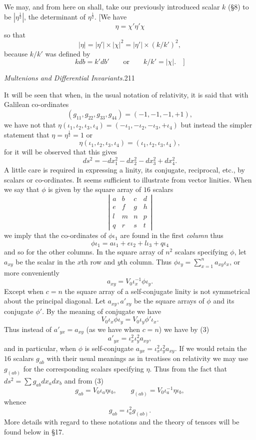 \documentclass[11pt]{article}
\begin{document}
\indent We may, and from here on shall, take our previously introduced scalar $k$ (§8) to be $|\eta^{\frac12}|$, the determinant of $\eta^{\frac12}$. [We have
\[
\eta=\chi'\eta'\chi
\]
so that
\[
|\eta|=|\eta'|\times|\chi|^2=|\eta'|\times(k/k')^2,
\]
because $k/k'$ was defined by
\[
kdb=k'db'\qquad\text{or}\qquad k/k'=|\chi|.\quad\text{]}
\]

\newpage\thispagestyle{empty}\begin{center}\textit{Multenions and Differential Invariants.}\hfill 211\end{center}
It will be seen that when, in the usual notation of relativity, it is said that with Galilean co-ordinates
\[
(g_{11},g_{22},g_{33},g_{44})=(-1,-1,-1,+1),
\]
we have not that $\eta(\iota_1,\iota_2,\iota_3,\iota_4)=(-\iota_1,-\iota_2,-\iota_3,+\iota_4)$ but instead the simpler statement that $\eta=\eta^{\frac12}=1$ or
\[
\eta(\iota_1,\iota_2,\iota_3,\iota_4)=(\iota_1,\iota_2,\iota_3,\iota_4),
\]
for it will be observed that this gives
\[
ds^2=-dx_1^2-dx_2^2-dx_3^2+dx_4^2.
\]
\indent A little care is required in expressing a linity, its conjugate, reciprocal, etc., by scalars or co-ordinates. It seems sufficient to illustrate from vector linities. When we say that $\phi$ is given by the square array of $16$ scalars
\[
\left|\begin{array}{cccc}a&b&c&d\\e&f&g&h\\l&m&n&p\\q&r&s&t\end{array}\right|
\]
we imply that the co-ordinates of $\phi\iota_1$ are found in the first \emph{column} thus
\[
\phi\iota_1=a\iota_1+e\iota_2+l\iota_3+q\iota_4
\]
and so for the other columns. In the square array of $n^2$ scalars specifying $\phi$, let $a_{xy}$ be the scalar in the $x$th row and $y$th column. Thus $\phi\iota_y=\sum_{x=1}^n a_{xy}\iota_x$, or more conveniently
\begin{equation}a_{xy}=V_0\iota_x^{-1}\phi\iota_y.\tag{3}\end{equation}
Except when $c=n$ the square array of a self-conjugate linity is not symmetrical about the principal diagonal. Let $a_{xy},a'_{xy}$ be the square arrays of $\phi$ and its conjugate $\phi'$. By the meaning of conjugate we have
\[
V_0\iota_x\phi\iota_y=V_0\iota_y\phi'\iota_x.
\]
Thus instead of $a'_{yx}=a_{xy}$ (as we have when $c=n$) we have by (3)
\begin{equation}a'_{yx}=\iota_x^2\iota_y^2a_{xy},\tag{4}\end{equation}
and in particular, when $\phi$ is self-conjugate $a_{yx}=\iota_x^2\iota_y^2a_{xy}$. If we would retain the $16$ scalars $g_{ab}$ with their usual meanings as in treatises on relativity we may use $g_{(ab)}$ for the corresponding scalars specifying $\eta$. Thus from the fact that $ds^2=\sum g_{ab}dx_adx_b$ and from (3)
\[
g_{ab}=V_0\iota_a\eta\iota_b,\qquad g_{(ab)}=V_0\iota_a^{-1}\eta\iota_b,
\]
whence
\begin{equation}g_{ab}=\iota_a^2g_{(ab)}.\tag{5}\end{equation}
More details with regard to these notations and the theory of tensors will be found below in §17.
\end{document}
